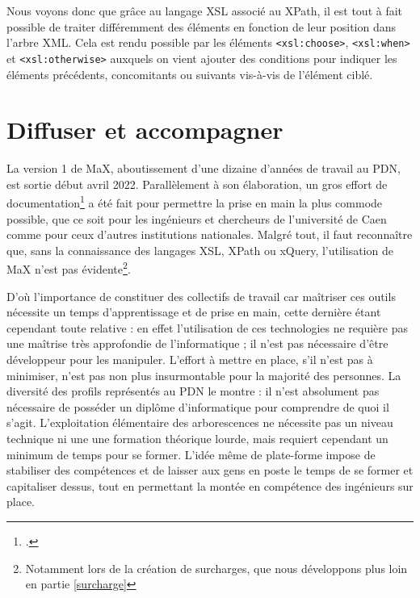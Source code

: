 \documentclass[a4paper,12pt,twoside]{book}
\begin{document}
    Nous voyons donc que grâce au langage \acrshort{XSL} associé au XPath, il est tout à fait possible de traiter différemment des éléments en fonction de leur position dans l'arbre XML. Cela est rendu possible par les éléments \texttt{<xsl:choose>}, \texttt{<xsl:when>} et \texttt{<xsl:otherwise>} auxquels on vient ajouter des conditions pour indiquer les éléments précédents, concomitants ou suivants vis-à-vis de l'élément ciblé.
    
    
\section{Diffuser et accompagner}
    La version 1 de MaX, aboutissement d'une dizaine d'années de travail au \acrshort{PDN}, est sortie début avril 2022. Parallèlement à son élaboration, un gros effort de documentation\footcite{MaX} a été fait pour permettre la prise en main la plus commode possible, que ce soit pour les ingénieurs et chercheurs de l'université de Caen comme pour ceux d'autres institutions nationales. Malgré tout, il faut reconnaître que, sans la connaissance des langages \acrshort{XSL}, XPath ou xQuery, l'utilisation de MaX n'est pas évidente\footnote{Notamment lors de la création de surcharges, que nous développons plus loin en partie \ref{surcharge}}.
    
   D’où l’importance de constituer des collectifs de travail car maîtriser ces outils nécessite un temps d'apprentissage et de prise en main, cette dernière étant cependant toute relative : en effet l'utilisation de ces technologies ne requière pas une maîtrise très approfondie de l'informatique ; il n'est pas nécessaire d'être développeur pour les manipuler. L'effort à mettre en place, s'il n'est pas à minimiser, n'est pas non plus insurmontable pour la majorité des personnes. La diversité des profils représentés au \acrshort{PDN} le montre : il n'est absolument pas nécessaire de posséder un diplôme d'informatique pour comprendre de quoi il s'agit. L'exploitation élémentaire des arborescences ne nécessite pas un niveau technique ni une une formation théorique lourde, mais requiert cependant un minimum de temps pour se former. L'idée même de plate-forme impose de stabiliser des compétences et de laisser aux gens en poste le temps de se former et capitaliser dessus, tout en permettant la montée en compétence des ingénieurs sur place.
    
\end{document}
